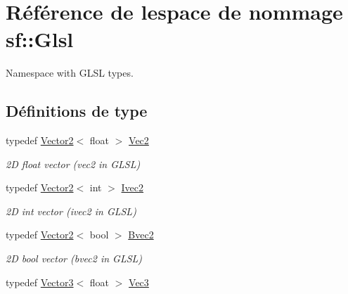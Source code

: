 \hypertarget{namespacesf_1_1Glsl}{}\section{Référence de l\textquotesingle{}espace de nommage sf\+:\+:Glsl}
\label{namespacesf_1_1Glsl}


Namespace with G\+L\+SL types.  


\subsection*{Définitions de type}
\begin{DoxyCompactItemize}
\item 
\mbox{\label{namespacesf_1_1Glsl_adeed356d346d87634b4c197a530e4edf}} 
typedef \hyperlink{classsf_1_1Vector2}{Vector2}$<$ float $>$ \hyperlink{namespacesf_1_1Glsl_adeed356d346d87634b4c197a530e4edf}{Vec2}
\begin{DoxyCompactList}\small\item\em 2D float vector ({\ttfamily vec2} in G\+L\+SL) \end{DoxyCompactList}\item 
\mbox{\label{namespacesf_1_1Glsl_aab803ee70c4b7bfcd63ec09e10408fd3}} 
typedef \hyperlink{classsf_1_1Vector2}{Vector2}$<$ int $>$ \hyperlink{namespacesf_1_1Glsl_aab803ee70c4b7bfcd63ec09e10408fd3}{Ivec2}
\begin{DoxyCompactList}\small\item\em 2D int vector ({\ttfamily ivec2} in G\+L\+SL) \end{DoxyCompactList}\item 
\mbox{\label{namespacesf_1_1Glsl_a59d8cf909c3d71ebf3db057480b464da}} 
typedef \hyperlink{classsf_1_1Vector2}{Vector2}$<$ bool $>$ \hyperlink{namespacesf_1_1Glsl_a59d8cf909c3d71ebf3db057480b464da}{Bvec2}
\begin{DoxyCompactList}\small\item\em 2D bool vector ({\ttfamily bvec2} in G\+L\+SL) \end{DoxyCompactList}\item 
\mbox{\label{namespacesf_1_1Glsl_a9bdd0463b7cb5316244a082007bd50f0}} 
typedef \hyperlink{classsf_1_1Vector3}{Vector3}$<$ float $>$ \hyperlink{namespacesf_1_1Glsl_a9bdd0463b7cb5316244a082007bd50f0}{Vec3}

\end{DoxyCompactItemize}
